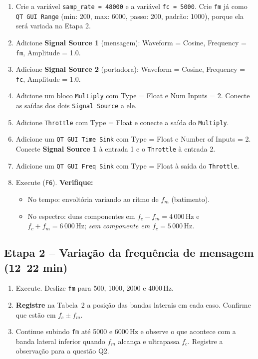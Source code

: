 \documentclass[11pt,a4paper]{article}
\begin{document}
\begin{instrucao}
\begin{enumerate}[label=\arabic*.]
  \item Crie a variável \texttt{samp\_rate = 48000} e a variável
    \texttt{fc = 5000}.  Crie \texttt{fm} já como \texttt{QT GUI Range}
    (min: 200, max: 6000, passo: 200, padrão: 1000), porque ela será
    variada na Etapa 2.
  \item Adicione \textbf{Signal Source 1} (mensagem):
    Waveform = Cosine, Frequency = \texttt{fm}, Amplitude = 1.0.
  \item Adicione \textbf{Signal Source 2} (portadora):
    Waveform = Cosine, Frequency = \texttt{fc}, Amplitude = 1.0.
  \item Adicione um bloco \texttt{Multiply} com Type = Float e
    Num Inputs = 2.  Conecte as saídas dos dois \texttt{Signal Source} a ele.
  \item Adicione \texttt{Throttle} com Type = Float e conecte a saída do
    \texttt{Multiply}.
  \item Adicione um \texttt{QT GUI Time Sink} com Type = Float e
    Number of Inputs = 2.  Conecte \textbf{Signal Source 1} à entrada 1 e o
    \texttt{Throttle} à entrada 2.
  \item Adicione um \texttt{QT GUI Freq Sink} com Type = Float à saída do
    \texttt{Throttle}.
  \item Execute (\texttt{F6}). \textbf{Verifique:}
    \begin{itemize}
      \item No tempo: envoltória variando ao ritmo de $f_m$ (batimento).
      \item No espectro: duas componentes em $f_c - f_m = 4\,000\,\text{Hz}$
        e $f_c + f_m = 6\,000\,\text{Hz}$; \emph{sem componente em
        $f_c = 5\,000\,\text{Hz}$}.
    \end{itemize}
\end{enumerate}
\end{instrucao}

\subsection*{Etapa 2 -- Variação da frequência de mensagem (12--22 min)}

\begin{instrucao}
\begin{enumerate}[label=\arabic*.]
  \item Execute. Deslize \texttt{fm} para 500, 1000, 2000 e 4000\,Hz.
  \item \textbf{Registre} na Tabela~2 a posição das bandas laterais em cada
    caso.  Confirme que estão em $f_c \pm f_m$.
  \item Continue subindo \texttt{fm} até 5000 e 6000\,Hz e observe o que
    acontece com a banda lateral inferior quando $f_m$ alcança e ultrapassa
    $f_c$.  Registre a observação para a questão Q2.
\end{enumerate}
\end{instrucao}
\end{document}
